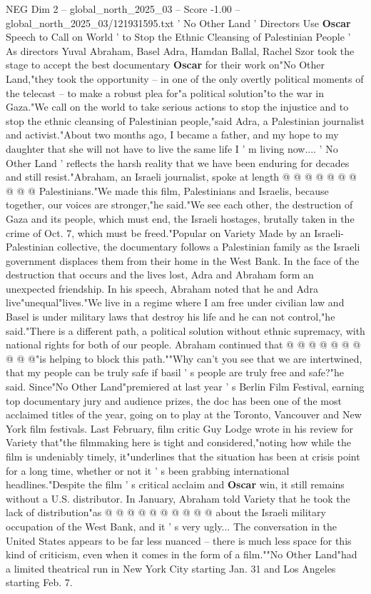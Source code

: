 \begin{textsample}{NEG Dim 2 – global\_north\_2025\_03 – Score -1.00 – global\_north\_2025\_03/121931595.txt}  \label{ex:f2_neg_026}
' No Other Land ' Directors Use \textbf{Oscar} Speech to Call on World ' to Stop the Ethnic Cleansing of Palestinian People ' As directors Yuval Abraham, Basel Adra, Hamdan Ballal, Rachel Szor took the stage to accept the best documentary \textbf{Oscar} for their work on"No Other Land,"they took the opportunity -- in one of the only overtly political moments of the telecast -- to make a robust plea for"a political solution"to the war in Gaza."We call on the world to take serious actions to stop the injustice and to stop the ethnic cleansing of Palestinian people,"said Adra, a Palestinian journalist and activist."About two months ago, I became a father, and my hope to my daughter that she will not have to live the same life I ' m living now.... ' No Other Land ' reflects the harsh reality that we have been enduring for decades and still resist."Abraham, an Israeli journalist, spoke at length @ @ @ @ @ @ @ @ @ @ Palestinians."We made this film, Palestinians and Israelis, because together, our voices are stronger,"he said."We see each other, the destruction of Gaza and its people, which must end, the Israeli hostages, brutally taken in the crime of Oct. 7, which must be freed."Popular on Variety Made by an Israeli-Palestinian collective, the documentary follows a Palestinian family as the Israeli government displaces them from their home in the West Bank.
In the face of the destruction that occurs and the lives lost, Adra and Abraham form an unexpected friendship.
In his speech, Abraham noted that he and Adra live"unequal"lives."We live in a regime where I am free under civilian law and Basel is under military laws that destroy his life and he can not control,"he said."There is a different path, a political solution without ethnic supremacy, with national rights for both of our people.
Abraham continued that @ @ @ @ @ @ @ @ @ @"is helping to block this path.""Why can't you see that we are intertwined, that my people can be truly safe if basil ' s people are truly free and safe?"he said.
Since"No Other Land"premiered at last year ' s Berlin Film Festival, earning top documentary jury and audience prizes, the doc has been one of the most acclaimed titles of the year, going on to play at the Toronto, Vancouver and New York film festivals.
Last February, film critic Guy Lodge wrote in his review for Variety that"the filmmaking here is tight and considered,"noting how while the film is undeniably timely, it"underlines that the situation has been at crisis point for a long time, whether or not it ' s been grabbing international headlines."Despite the film ' s critical acclaim and \textbf{Oscar} win, it still remains without a U.S. distributor.
In January, Abraham told Variety that he took the lack of distribution"as @ @ @ @ @ @ @ @ @ @ about the Israeli military occupation of the West Bank, and it ' s very ugly...
The conversation in the United States appears to be far less nuanced -- there is much less space for this kind of criticism, even when it comes in the form of a film.""No Other Land"had a limited theatrical run in New York City starting Jan. 31 and Los Angeles starting Feb. 7.

\end{textsample}
